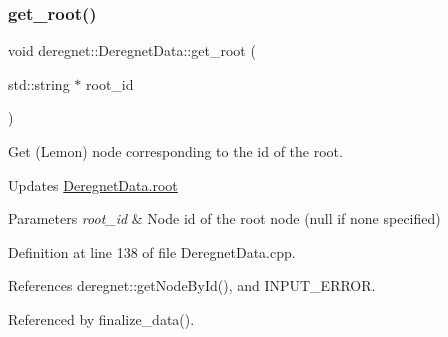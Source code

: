 \subsubsection{\texorpdfstring{get\+\_\+root()}{get\_root()}}
{\footnotesize\ttfamily void deregnet\+::\+Deregnet\+Data\+::get\+\_\+root (\begin{DoxyParamCaption}\item[{std\+::string $\ast$}]{root\+\_\+id }\end{DoxyParamCaption})}



Get (Lemon) node corresponding to the id of the root. 

Updates \hyperlink{classderegnet_1_1DeregnetData_a51a22fd88f929b1b1a00edb409b4cd55}{Deregnet\+Data.\+root}


\begin{DoxyParams}{Parameters}
{\em root\+\_\+id} & Node id of the root node (null if none specified) \\
\hline
\end{DoxyParams}


Definition at line 138 of file Deregnet\+Data.\+cpp.



References deregnet\+::get\+Node\+By\+Id(), and I\+N\+P\+U\+T\+\_\+\+E\+R\+R\+OR.



Referenced by finalize\+\_\+data().


